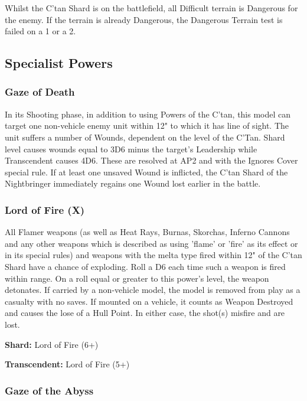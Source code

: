 Whilst the C'tan Shard is on the battlefield, all Difficult terrain is Dangerous for the enemy. If the terrain is already Dangerous, the Dangerous Terrain test is failed on a 1 or a 2.

\subsection{Specialist Powers}

\subsubsection{Gaze of Death} \label{Gaze of Death}

In its Shooting phase, in addition to using Powers of the C’tan, this model can target one non-vehicle enemy unit within 12" to which it has line of sight. The unit suffers a number of Wounds, dependent on the level of the C'Tan. Shard level causes wounds equal to 3D6 minus the target's Leadership while Transcendent causes 4D6. These are resolved at AP2 and with the Ignores Cover special rule. If at least one unsaved Wound is inflicted, the C’tan Shard of the Nightbringer immediately regains one Wound lost earlier in the battle.

\subsubsection{Lord of Fire (X)} \label{Lord of Fire}

All Flamer weapons (as well as Heat Rays, Burnas, Skorchas, Inferno Cannons and any other weapons which is described as using 'flame' or 'fire' as its effect or in its special rules) and weapons with the melta type fired within 12" of the C'tan Shard have a chance of exploding. Roll a D6 each time such a weapon is fired within range. On a roll equal or greater to this power's level, the weapon detonates. If carried by a non-vehicle model, the model is removed from play as a casualty with no saves. If mounted on a vehicle, it counts as Weapon Destroyed and causes the lose of a Hull Point. In either case, the shot(s) misfire and are lost.

\textbf{Shard:} Lord of Fire (6+)

\textbf{Transcendent:} Lord of Fire (5+)


\subsubsection{Gaze of the Abyss} \label{Gaze of the Abyss}

